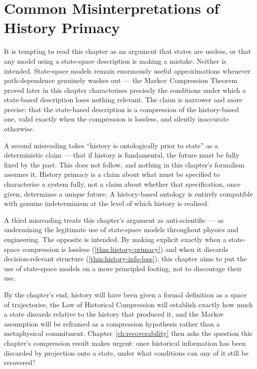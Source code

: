 \documentclass[12pt,twoside,openright]{book}
\begin{document}
\section{Common Misinterpretations of History Primacy}
\label{sec:ch4-misinterpretations}

It is tempting to read this chapter as an argument that
states are useless, or that any model using a state-space
description is making a mistake. Neither is intended.
State-space models remain enormously useful approximations
whenever path-dependence genuinely washes out --- the Markov
Compression Theorem proved later in this chapter
characterises precisely the conditions under which a
state-based description loses nothing relevant. The claim is
narrower and more precise: that the state-based description
is a compression of the history-based one, valid exactly when
the compression is lossless, and silently inaccurate
otherwise.

A second misreading takes ``history is ontologically prior
to state'' as a deterministic claim --- that if history is
fundamental, the future must be fully fixed by the past. This
does not follow, and nothing in this chapter's formalism
assumes it. History primacy is a claim about what must be
specified to characterise a system fully, not a claim about
whether that specification, once given, determines a unique
future. A history-based ontology is entirely compatible with
genuine indeterminism at the level of which history is
realised.

A third misreading treats this chapter's argument as
anti-scientific --- as undermining the legitimate use of
state-space models throughout physics and engineering. The
opposite is intended. By making explicit exactly when a
state-space compression is lossless
(\cref{thm:history-primacy}) and when it discards
decision-relevant structure (\cref{thm:history-info-loss}),
this chapter aims to put the use of state-space models on a
more principled footing, not to discourage their use.

By the chapter's end, history will have been given a formal
definition as a space of trajectories, the Law of Historical
Compression will establish exactly how much a state discards
relative to the history that produced it, and the Markov
assumption will be reframed as a compression hypothesis
rather than a metaphysical commitment.
Chapter~\ref{ch:recoverability} then asks the question this
chapter's compression result makes urgent: once historical
information has been discarded by projection onto a state,
under what conditions can any of it still be recovered?
\end{document}
